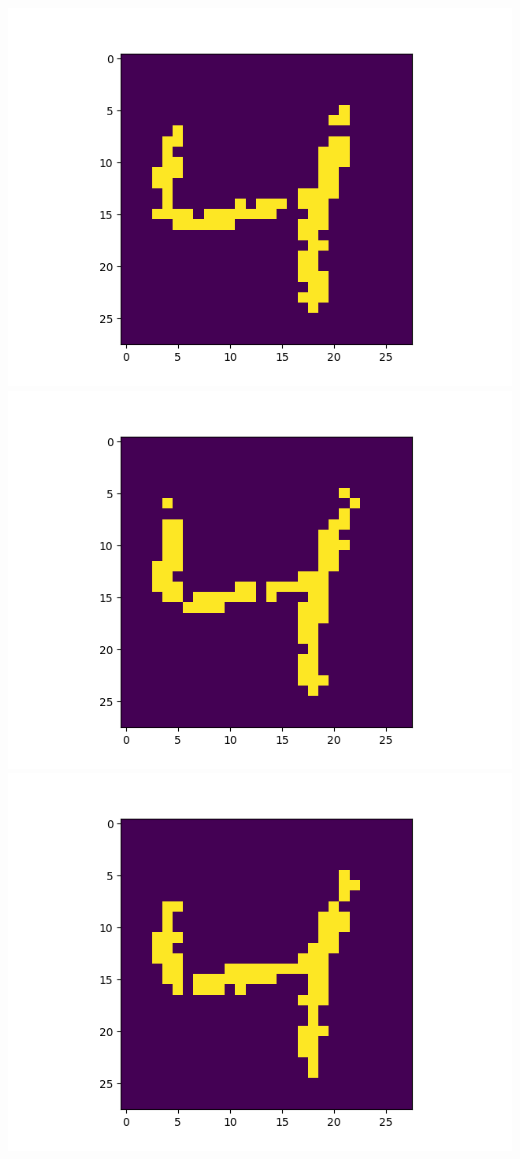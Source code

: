 \includegraphics[scale=0.2]{./bilder/comparison/prob/34}
\includegraphics[scale=0.2]{./bilder/comparison/prob/35}
\includegraphics[scale=0.2]{./bilder/comparison/prob/36}
